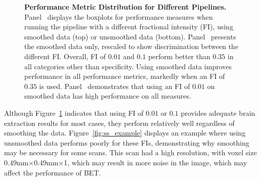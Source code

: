 \documentclass{elsarticle}\usepackage[]{graphicx}\usepackage[]{color}
\begin{document}
\begin{figure}
\hfill
\caption{{\bf Performance Metric Distribution for Different Pipelines.} Panel~\protect{} displays the boxplots for performance measures when running the pipeline with a different fractional intensity (FI), using smoothed data (top) or unsmoothed data (bottom).  Panel~\protect{} presents the smoothed data only, rescaled to show discrimination between the different FI. Overall, FI of $0.01$ and $0.1$ perform better than $0.35$ in all categories other than specificity.  Using smoothed data improves performance in all performance metrics, markedly when an FI of $0.35$ is used.  Panel~\protect{} demonstrates that using an FI of $0.01$ on smoothed data has high performance on all measures.  }
\label{fig:metrics}
\end{figure}


Although Figure~\ref{fig:metrics} indicates that using FI of $0.01$ or $0.1$ provides adequate brain extraction results for most cases, they perform relatively well regardless of smoothing the data.  Figure~\ref{fig:ss_example} displays an example where using unsmoothed data performs poorly for these FIs, demonstrating why smoothing may be necessary for some scans.  This scan had a high resolution, with voxel size 0.49mm$\times$0.49mm$\times$1, which may result in more noise in the image, which may affect the performance of BET.  
\end{document}
